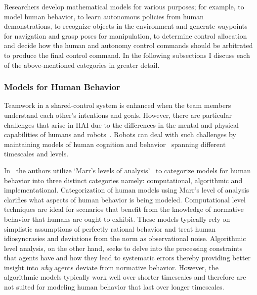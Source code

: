 \documentclass[12pt]{article}
\begin{document}
Researchers develop mathematical models for various purposes; for example, to model human behavior, to learn autonomous policies from human demonstrations, to recognize objects in the environment and generate waypoints for navigation and grasp poses for manipulation, to determine control allocation and decide how the human and autonomy control commands should be arbitrated to produce the final control command. In the following subsections I discuss each of the above-mentioned categories in greater detail.  

\subsubsection{Models for Human Behavior}
Teamwork in a shared-control system is enhanced when the team members understand each other's intentions and goals. However, there are particular challenges that arise in HAI  due to the differences in the mental and physical capabilities of humans and robots~\cite{hiatt2017human}. Robots can deal with such challenges by maintaining models of human cognition and behavior~\cite{javdani2015shared} spanning different timescales and levels. 

 In~\cite{hiatt2017human} the authors utilize `Marr's levels of analysis'~\cite{marr1982vision} to categorize models for human behavior into three distinct categories namely: computational, algorithmic and implementational.
Categorization of human models using Marr's level of analysis clarifies what aspects of human behavior is being modeled. Computational level techniques are ideal for scenarios that benefit from the knowledge of normative behavior that humans are ought to exhibit. These models typically rely on simplistic assumptions of perfectly rational behavior and treat human idiosyncrasies and deviations from the norm as observational noise. Algorithmic level analysis, on the other hand, seeks to delve into the processing constraints that agents have and how they lead to systematic errors thereby providing better insight into \textit{why} agents deviate from normative behavior. However, the algorithmic models typically work well over shorter timescales and therefore are not suited for modeling human behavior that last over longer timescales. 
\end{document}
